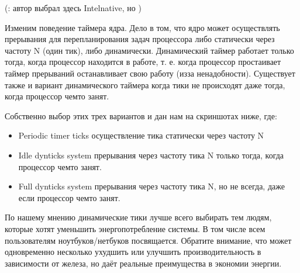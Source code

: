 \documentclass[letterpaper,10pt,russian,openany]{sphinxmanual}
\begin{document}
\sphinxAtStartPar
{}

\noindent{}

\sphinxAtStartPar
{}

\noindent{}

\sphinxAtStartPar
{}

\noindent{}

\sphinxAtStartPar
(: автор выбрал здесь Intel\sphinxhyphen{}native, но  )

\sphinxAtStartPar
{} Изменим поведение таймера ядра.
Дело в том, что ядро может осуществлять прерывания для перепланирования задач процессора либо статически через частоту N (один тик), либо динамически.
Динамический таймер работает только тогда, когда процессор находится в работе, т. е. когда процессор простаивает
таймер прерываний останавливает свою работу (из\sphinxhyphen{}за ненадобности). Существует также и вариант динамического таймера
когда тики не происходят даже тогда, когда процессор чем\sphinxhyphen{}то занят.

\sphinxAtStartPar
Собственно выбор этих трех вариантов и дан нам на скриншотах ниже, где:
\begin{itemize}
\item {} 
\sphinxAtStartPar
Periodic timer ticks \sphinxhyphen{} осуществление тика статически через частоту N

\item {} 
\sphinxAtStartPar
Idle dynticks system \sphinxhyphen{} прерывания через частоту тика N только тогда, когда процессор чем\sphinxhyphen{}то занят.

\item {} 
\sphinxAtStartPar
Full dynticks system \sphinxhyphen{} прерывания через частоту тика N, но не всегда, даже если процессор чем\sphinxhyphen{}то занят.

\end{itemize}

\sphinxAtStartPar
{}

\sphinxAtStartPar
По нашему мнению динамические тики лучше всего выбирать тем людям, которые хотят уменьшить энергопотребление системы.
В том числе всем пользователям ноутбуков/нетбуков посвящается. Обратите внимание, что  может одновременно
несколько ухудшить или улучшить производительность в зависимости от железа, но даёт реальные преимущества в экономии энергии.
\end{document}
